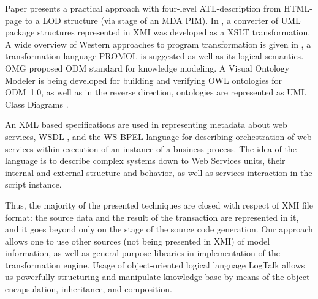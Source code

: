 \documentclass[conference]{IEEEtran}
\begin{document}
Paper \cite{Malki} presents a practical approach with four-level ATL-description from HTML-page to a LOD structure (via stage of an MDA PIM). In \cite{uml2owl}, a converter of UML package structures represented in XMI was developed as a XSLT transformation. A wide overview of Western approaches to program transformation is given in \cite{Dama,Dama2}, a transformation language PROMOL is suggested as well as its logical semantics. OMG proposed ODM standard \cite{odmprof} for knowledge modeling.  A Visual Ontology Modeler \cite{odnext} is being developed for building and verifying OWL ontologies for ODM~1.0, as well as in the reverse direction, ontologies are represented as UML Class Diagrams \cite{odmvis}.

An XML based specifications are used in representing metadata about web services, WSDL \cite{wsdl}, and the WS-BPEL language \cite{wsbpel} for describing orchestration of web services within execution of an instance of a business process.  The idea of the language is to describe complex systems down to Web Services units, their internal and external structure and behavior, as well as services interaction in the script instance.

Thus, the majority of the presented techniques are closed with respect of XMI file format: the source data and the result of the transaction are represented in it, and it goes beyond only on the stage of the source code generation.  Our approach allows one to use other sources (not being presented in XMI) of model information, as well as general purpose libraries in implementation of the transformation engine.  Usage of object-oriented logical language LogTalk allows us powerfully structuring and manipulate knowledge base by means of the object encapsulation, inheritance, and composition.


\end{document}
